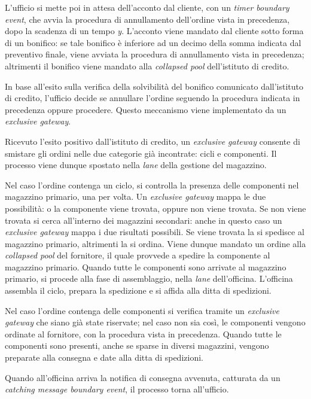 L'ufficio si mette poi in attesa dell'acconto dal cliente, con un
\textit{timer boundary event}, che avvia la procedura di annullamento
dell'ordine vista in precedenza, dopo la scadenza di un tempo
\textit{y}. L'acconto viene mandato dal cliente sotto forma di un
bonifico: se tale bonifico \`e inferiore ad un decimo della somma
indicata dal preventivo finale, viene avviata la procedura di
annullamento vista in precedenza; altrimenti il bonifico viene mandato
alla \textit{collapsed pool} dell'istituto di credito.

In base all'esito sulla verifica della solvibilit\`a del bonifico
comunicato \linebreak dall'istituto di credito, l'ufficio decide se annullare
l'ordine seguendo la procedura indicata in precedenza oppure procedere.
Questo meccanismo viene implementato da un \textit{exclusive gateway}.

Ricevuto l'esito positivo dall'istituto di credito, un
\textit{exclusive gateway} consente di smistare gli ordini nelle due
categorie gi\`a incontrate: cicli e componenti. Il processo viene dunque
spostato nella \textit{lane} della gestione del magazzino.

Nel caso l'ordine contenga un ciclo, si controlla la presenza delle
componenti nel magazzino primario, una per volta. Un
\textit{exclusive gateway} mappa le due possibilit\`a: o la componente
viene trovata, oppure non viene trovata.
Se non viene trovata si cerca all'interno dei magazzini secondari:
anche in questo caso un \textit{exclusive gateway} mappa i due risultati
possibili. Se viene trovata la si spedisce al magazzino primario,
altrimenti la si ordina. Viene dunque mandato un ordine alla
\textit{collapsed pool} del fornitore, il quale provvede a spedire la
componente al magazzino primario. Quando tutte le componenti sono
arrivate al magazzino primario, si procede alla fase di assemblaggio,
nella \textit{lane} dell'officina. L'officina assembla il ciclo, prepara
la spedizione e si affida alla ditta di spedizioni.

Nel caso l'ordine contenga delle componenti si verifica tramite un
\textit{exclusive gateway} che siano gi\`a state riservate; nel caso non
sia cos\`i, le componenti vengono ordinate al fornitore, con la
procedura vista in precedenza. Quando tutte le componenti sono presenti,
anche se sparse in diversi magazzini, vengono preparate alla consegna e
date alla ditta di spedizioni.

Quando all'officina arriva la notifica di consegna avvenuta, catturata
da un \textit{catching message boundary event}, il processo torna
all'ufficio.

